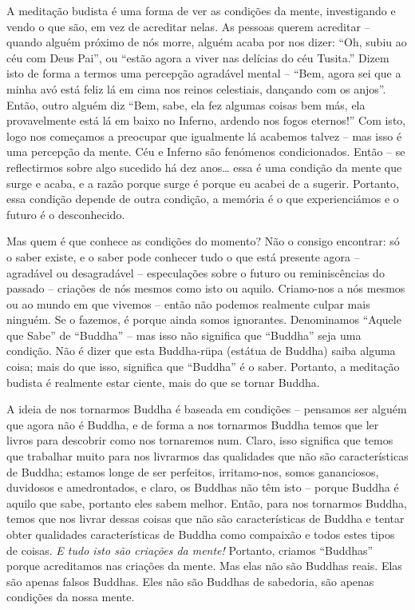 A meditação budista é uma forma de ver as condições da mente, investigando e
vendo o que são, em vez de acreditar nelas. As pessoas querem acreditar --
quando alguém próximo de nós morre, alguém acaba por nos dizer: ``Oh, subiu ao
céu com Deus Pai'', ou ``estão agora a viver nas delícias do céu Tusita.'' Dizem
isto de forma a termos uma percepção agradável mental -- ``Bem, agora sei que a
minha avó está feliz lá em cima nos reinos celestiais, dançando com os anjos''.
Então, outro alguém diz ``Bem, sabe, ela fez algumas coisas bem más, ela
provavelmente está lá em baixo no Inferno, ardendo nos fogos eternos!'' Com
isto, logo nos começamos a preocupar que igualmente lá acabemos talvez -- mas
isso é uma percepção da mente. Céu e Inferno são fenómenos condicionados. Então
-- se reflectirmos sobre algo sucedido há dez anos\ldots{} essa é uma condição da
mente que surge e acaba, e a razão porque surge é porque eu acabei de a sugerir.
Portanto, essa condição depende de outra condição, a memória é o que
experienciámos e o futuro é o desconhecido.

Mas quem é que conhece as condições do momento? Não o consigo encontrar: só o
saber existe, e o saber pode conhecer tudo o que está presente agora --
agradável ou desagradável -- especulações sobre o futuro ou reminiscências do
passado -- criações de nós mesmos como isto ou aquilo. Criamo-nos a nós mesmos
ou ao mundo em que vivemos -- então não podemos realmente culpar mais ninguém.
Se o fazemos, é porque ainda somos ignorantes. Denominamos ``Aquele que Sabe''
de ``Buddha'' -- mas isso não significa que ``Buddha'' seja uma condição. Não é
dizer que esta Buddha-rūpa (estátua de Buddha) saiba alguma coisa; mais do que
isso, significa que ``Buddha'' é o saber. Portanto, a meditação budista é
realmente estar ciente, mais do que se tornar Buddha.

A ideia de nos tornarmos Buddha é baseada em condições -- pensamos ser alguém
que agora não é Buddha, e de forma a nos tornarmos Buddha temos que ler livros
para descobrir como nos tornaremos num. Claro, isso significa que temos que
trabalhar muito para nos livrarmos das qualidades que não são características de
Buddha; estamos longe de ser perfeitos, irritamo-nos, somos gananciosos,
duvidosos e amedrontados, e claro, os Buddhas não têm isto -- porque Buddha é
aquilo que sabe, portanto eles sabem melhor. Então, para nos tornarmos Buddha,
temos que nos livrar dessas coisas que não são características de Buddha e
tentar obter qualidades características de Buddha como compaixão e todos estes
tipos de coisas. \emph{E tudo isto são criações da mente!} Portanto, criamos
``Buddhas'' porque acreditamos nas criações da mente. Mas elas não são Buddhas
reais. Elas são apenas falsos Buddhas. Eles não são Buddhas de sabedoria, são
apenas condições da nossa mente.

